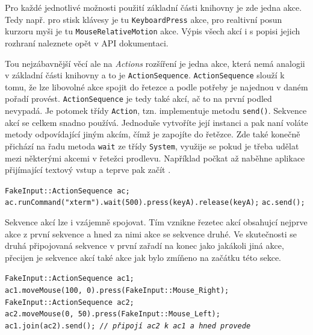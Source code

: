 \documentclass[12pt]{article}
\newcommand{\code}[1]{\texttt{#1}}
\begin{document}
    Pro každé jednotlivé možnosti použití základní části knihovny je zde jedna akce. Tedy např. pro stisk klávesy je tu \code{KeyboardPress} akce, pro realtivní posun kurzoru myši je tu \code{MouseRelativeMotion} akce. Výpis všech akcí i s popisi jejich rozhraní naleznete opět v API dokumentaci.
    
    Tou nejzábavnější věcí ale na \emph{Actions} rozšíření je jedna akce, která nemá analogii v základní části knihovny a to je \code{ActionSequence}. \code{ActionSequence} slouží k tomu, že lze libovolné akce spojit do řetezce a podle potřeby je najednou v daném pořadí provést. \code{ActionSequence} je tedy také akcí, ač to na první podled nevypadá. Je potomek třídy \code{Action}, tzn. implementuje metodu \code{send()}. Sekvence akcí se celkem snadno používá. Jednoduše vytvoříte její instanci a pak naní voláte metody odpovídající jiným akcím, čímž je zapojíte do řetězce. Zde také konečně přichází na řadu metoda \code{wait} ze třídy \code{System}, využije se pokud je třeba udělat mezi některými akcemi v řetežci prodlevu. Například počkat až naběhne aplikace přijímající textový vstup a teprve pak začít . 

        \begin{center}
            \begin{minipage}{1\textwidth}
                \code{FakeInput::ActionSequence ac;}\\
                \code{ac.runCommand("xterm").wait(500).press(keyA).release(keyA);}
                \code{ac.send();}
            \end{minipage}
        \end{center}

    Sekvence akcí lze i vzájemně spojovat. Tím vznikne řezetec akcí obsahujcí nejprve akce z první sekvence a hned za nimi akce se sekvence druhé. Ve skutečnosti se druhá připojovaná sekvence v první zařadí na konec jako jakákoli jiná akce, přecijen je sekvence akcí také akce jak bylo zmíňeno na začátku této sekce.

        \begin{center}
            \begin{minipage}{0.93\textwidth}
                \code{FakeInput::ActionSequence ac1;}\\
                \code{ac1.moveMouse(100, 0).press(FakeInput::Mouse\_Right);}\\
                \code{FakeInput::ActionSequence ac2;}\\
                \code{ac2.moveMouse(0, 50).press(FakeInput::Mouse\_Left);}
                \code{ac1.join(ac2).send(); \emph{// připojí ac2 k ac1 a hned provede}}
            \end{minipage}
        \end{center}
\end{document}
